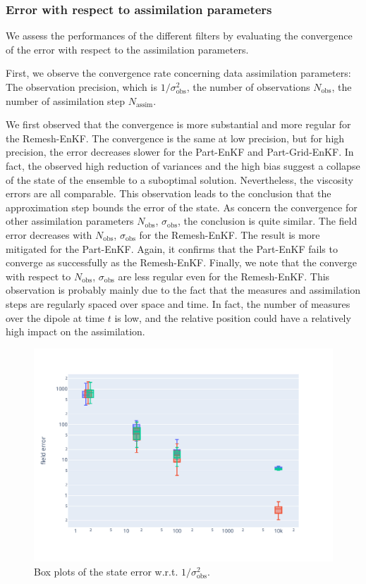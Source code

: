 \subsubsection{Error with respect to assimilation parameters}
We assess the performances of the different filters by evaluating the convergence of the error with respect to the assimilation parameters.

First, we observe the convergence rate concerning data assimilation parameters: The observation precision, which is \(1/\sigma_{\text{obs}}^2\), the number of observations \(N_{\text{obs}}\), the number of assimilation step \(N_{\text{assim}}\).

We first observed that the convergence is more substantial and more regular for the Remesh-EnKF. The convergence is the same at low precision, but for high precision, the error decreases slower for the Part-EnKF and Part-Grid-EnKF. In fact, the observed high reduction of variances and the high bias suggest a collapse of the state of the ensemble to a suboptimal solution. Nevertheless, the viscosity errors are all comparable. This observation leads to the conclusion that the approximation step bounds the error of the state.
As concern the convergence for other assimilation parameters \(N_{\text{obs}}\), \(\sigma_{\text{obs}}\), the conclusion is quite similar. The field error decreases with \(N_{\text{obs}}\), \(\sigma_{\text{obs}}\) for the Remesh-EnKF. The result is more mitigated for the Part-EnKF. Again, it confirms that the Part-EnKF fails to converge as successfully as the Remesh-EnKF.
Finally, we note that the converge with respect to \(N_{\text{obs}}\), \(\sigma_{\text{obs}}\) are less regular even for the Remesh-EnKF. This observation is probably mainly due to the fact that the measures and assimilation steps are regularly spaced over space and time. In fact, the number of measures over the dipole at time $t$ is low, and the relative position could have a relatively high impact on the assimilation.

\begin{figure}[htbp]
	\captionsetup{labelformat=empty}
	\centering
	\includegraphics[width=0.6\linewidth]{./images/app2d/MSE_obs_precision_box.pdf}
	\caption{Box plots of the state error w.r.t. $1/\sigma_{\text{obs}}^2$.}
	\label{fig:obs_precision}
\end{figure}

